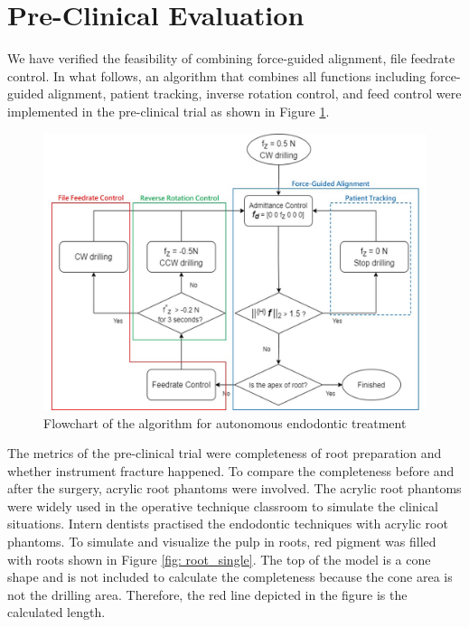 \newpage

\section{Pre-Clinical Evaluation}
\hspace*{6mm}We have verified the feasibility of combining force-guided alignment, file feedrate control. In what follows, an algorithm that combines all functions including force-guided alignment, patient tracking, inverse rotation control, and feed control were implemented in the pre-clinical trial as shown in Figure \ref{fig: exp2_motion planning}.
\begin{figure}[htbp]
\begin{center}
\includegraphics[width=1\linewidth]{Images/autonomous.jpg}
\end{center}
\caption{
Flowchart of the algorithm for autonomous endodontic treatment
}\label{fig: exp2_motion planning}
\end{figure}
\par
The metrics of the pre-clinical trial were completeness of root preparation and whether instrument fracture happened. To compare the completeness before and after the surgery, acrylic root phantoms were involved. The acrylic root phantoms were widely used in the operative technique classroom to simulate the clinical situations. Intern dentists practised the endodontic techniques with acrylic root phantoms. To simulate and visualize the pulp in roots, red pigment was filled with roots shown in Figure \ref{fig: root_single}. The top of the model is a cone shape and is not included to calculate the completeness because the cone area is not the drilling area. Therefore, the red line depicted in the figure is the calculated length. 

